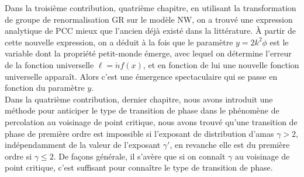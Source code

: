 Dans la troisième contribution, quatrième chapitre, en utilisant la transformation de groupe de renormalisation GR sur le modèle NW, on a trouvé une expression analytique de PCC  mieux que l'ancien déjà existé dans la littérature. \`{A} partir de cette nouvelle expression, on a déduit  à la fois que le paramètre $y=2k^2\phi$ est le variable dont la propriété petit-monde émerge, avec lequel on détermine l'erreur de la fonction universelle $\ell=\acute{n}f(x)$, et en fonction de lui une nouvelle fonction universelle apparaît. Alors c'est une émergence spectaculaire qui se passe en fonction du paramètre $y$.\\

Dans la quatrième contribution, dernier chapitre, nous avons introduit une méthode pour anticiper  le type de transition de phase dans le phénomène de percolation au voisinage de point critique, nous avons trouvé qu'une transition de phase de première ordre est impossible si l'exposant de distribution d'amas $\gamma>2$, indépendamment de la valeur de l'exposant $\gamma'$, en revanche elle est du première ordre si $\gamma\leq2$. De façons générale, il s'avère que si on connaît $\gamma$ au voisinage de point critique, c'est suffisant pour connaître le type de transition de phase.\\  

 